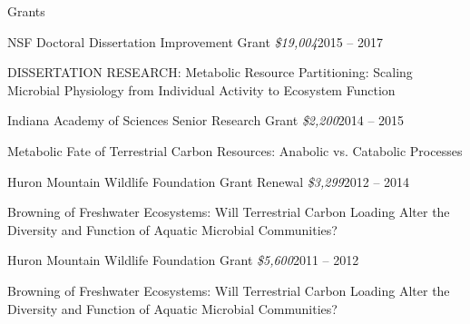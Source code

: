 \documentclass{resume} %
\begin{document}
\begin{rSection}{Grants}

    \begin{rSubsection}{NSF Doctoral Dissertation Improvement Grant
      {\normalfont \em \$19,004}}{2015 -- 2017}{}{}
      \item DISSERTATION RESEARCH: Metabolic Resource Partitioning: Scaling
      Microbial Physiology from Individual Activity to Ecosystem Function
    \end{rSubsection}

    \begin{rSubsection}{Indiana Academy of Sciences Senior Research Grant
      {\normalfont \em \$2,200}}{2014 -- 2015}{}{}
      \item Metabolic Fate of Terrestrial Carbon Resources: Anabolic vs.
      Catabolic Processes
    \end{rSubsection}

    \begin{rSubsection}{Huron Mountain Wildlife Foundation Grant Renewal
      {\normalfont \em \$3,299}}{2012 -- 2014}{}{}
      \item Browning of Freshwater Ecosystems: Will Terrestrial Carbon Loading
      Alter the Diversity and Function of Aquatic Microbial Communities?
    \end{rSubsection}

    \begin{rSubsection}{Huron Mountain Wildlife Foundation Grant
      {\normalfont \em \$5,600}}{2011 -- 2012}{}{}
      \item Browning of Freshwater Ecosystems: Will Terrestrial Carbon Loading
      Alter the Diversity and Function of Aquatic Microbial Communities?
    \end{rSubsection}

\end{rSection}

\end{document}
